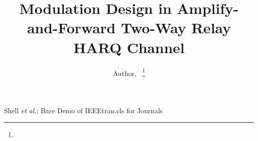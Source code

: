 \documentclass[journal]{IEEEtran}
\begin{document}
%
\title{Modulation Design in Amplify-and-Forward Two-Way Relay HARQ Channel}
%
%
%

\author{
  Author,~
  \thanks{}%
}

% 
%



%
{Shell \MakeLowercase{\textit{et al.}}: Bare Demo of IEEEtran.cls for Journals}
% 
\end{document}
